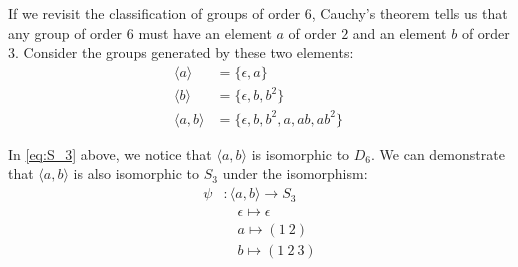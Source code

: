 If we revisit the classification of groups of order $6$,
Cauchy's theorem tells us that any group of order $6$ must have
an element $a$ of order $2$ and an element $b$ of order $3$.
Consider the groups generated by these two elements:
\begin{align}
  \langle a \rangle & = \{ \epsilon, a \} \\
  \langle b \rangle & = \{ \epsilon, b, b^2 \} \\
  \langle a, b \rangle & = \{ \epsilon, b, b^2, a, ab, ab^2 \}~\label{eq:S_3}
\end{align}

In \ref{eq:S_3} above, we notice that $\langle a, b \rangle$ is isomorphic to $D_6$.
We can demonstrate that $\langle a, b \rangle$ is also isomorphic to $S_3$
under the isomorphism:
\begin{align*}
  \psi &\colon \langle a, b \rangle \to S_3 \\
  &\quad \epsilon \mapsto \epsilon \\
  &\quad a \mapsto (1\ 2) \\
  &\quad b \mapsto (1\ 2\ 3)
\end{align*}

